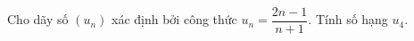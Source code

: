 \begin{ex}
Cho dãy số $(u_n)$ xác định bởi công thức $u_n=\dfrac{2n-1}{n+1}$. Tính số hạng $u_4$.
\end{ex}
